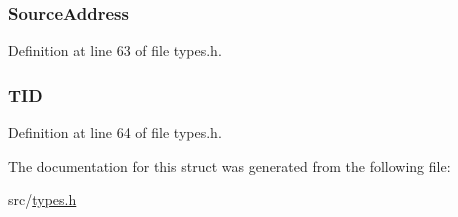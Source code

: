 \subsubsection[{Source\+Address}]{ Source\+Address}\label{struct_out_pack___type_def_adf5bc4e40bad06fdd0c2b4e48f18831b}


Definition at line 63 of file types.\+h.

\hypertarget{struct_out_pack___type_def_ad1076cc9b9c0e86656584b48e443d884}{}
\subsubsection[{T\+I\+D}]{ T\+I\+D}\label{struct_out_pack___type_def_ad1076cc9b9c0e86656584b48e443d884}


Definition at line 64 of file types.\+h.



The documentation for this struct was generated from the following file\+:\begin{DoxyCompactItemize}
\item 
src/\hyperlink{types_8h}{types.\+h}\end{DoxyCompactItemize}
